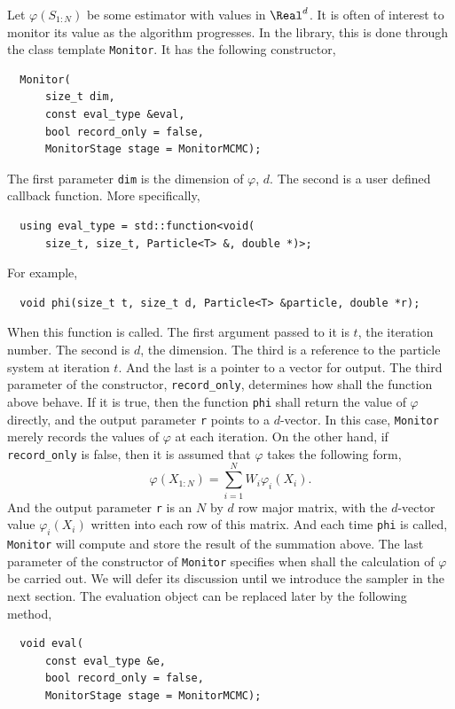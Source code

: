 Let $\varphi(S_{1:N})$ be some estimator with values in $\Real^d$. It is often
of interest to monitor its value as the algorithm progresses. In the library,
this is done through the class template \verb|Monitor|. It has the following
constructor,
\begin{Verbatim}
  Monitor(
      size_t dim,
      const eval_type &eval,
      bool record_only = false,
      MonitorStage stage = MonitorMCMC);
\end{Verbatim}
The first parameter \verb|dim| is the dimension of $\varphi$, $d$. The second
is a user defined callback function. More specifically,
\begin{Verbatim}
  using eval_type = std::function<void(
      size_t, size_t, Particle<T> &, double *)>;
\end{Verbatim}
For example,
\begin{Verbatim}
  void phi(size_t t, size_t d, Particle<T> &particle, double *r);
\end{Verbatim}
When this function is called. The first argument passed to it is $t$, the
iteration number. The second is $d$, the dimension. The third is a reference to
the particle system at iteration $t$. And the last is a pointer to a vector for
output. The third parameter of the constructor, \verb|record_only|, determines
how shall the function above behave. If it is true, then the function
\verb|phi| shall return the value of $\varphi$ directly, and the output
parameter \verb|r| points to a $d$-vector. In this case, \verb|Monitor| merely
records the values of $\varphi$ at each iteration. On the other hand, if
\verb|record_only| is false, then it is assumed that $\varphi$ takes the
following form,
\begin{equation*}
  \varphi(X_{1:N}) = \sum_{i=1}^N W_i \varphi_i(X_i).
\end{equation*}
And the output parameter \verb|r| is an $N$ by $d$ row major matrix, with the
$d$-vector value $\varphi_i(X_i)$ written into each row of this matrix. And
each time \verb|phi| is called, \verb|Monitor| will compute and store the
result of the summation above. The last parameter of the constructor of
\verb|Monitor| specifies when shall the calculation of $\varphi$ be carried
out. We will defer its discussion until we introduce the sampler in the next
section. The evaluation object can be replaced later by the following method,
\begin{Verbatim}
  void eval(
      const eval_type &e,
      bool record_only = false,
      MonitorStage stage = MonitorMCMC);
\end{Verbatim}

